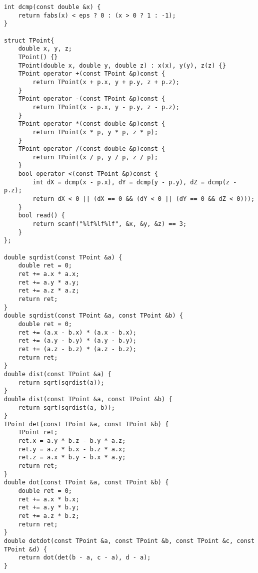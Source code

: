 \begin{lstlisting}
int dcmp(const double &x) {
	return fabs(x) < eps ? 0 : (x > 0 ? 1 : -1);
}

struct TPoint{
	double x, y, z;
	TPoint() {}
	TPoint(double x, double y, double z) : x(x), y(y), z(z) {}
	TPoint operator +(const TPoint &p)const {
		return TPoint(x + p.x, y + p.y, z + p.z);
	}
	TPoint operator -(const TPoint &p)const {
		return TPoint(x - p.x, y - p.y, z - p.z);
	}
	TPoint operator *(const double &p)const {
		return TPoint(x * p, y * p, z * p);
	}
	TPoint operator /(const double &p)const {
		return TPoint(x / p, y / p, z / p);
	}
	bool operator <(const TPoint &p)const {
		int dX = dcmp(x - p.x), dY = dcmp(y - p.y), dZ = dcmp(z - p.z);
		return dX < 0 || (dX == 0 && (dY < 0 || (dY == 0 && dZ < 0)));
	}
	bool read() {
		return scanf("%lf%lf%lf", &x, &y, &z) == 3;
	}
};

double sqrdist(const TPoint &a) {
	double ret = 0;
	ret += a.x * a.x;
	ret += a.y * a.y;
	ret += a.z * a.z;
	return ret;
}
double sqrdist(const TPoint &a, const TPoint &b) {
	double ret = 0;
	ret += (a.x - b.x) * (a.x - b.x);
	ret += (a.y - b.y) * (a.y - b.y);
	ret += (a.z - b.z) * (a.z - b.z);
	return ret;
}
double dist(const TPoint &a) {
	return sqrt(sqrdist(a));
}
double dist(const TPoint &a, const TPoint &b) {
	return sqrt(sqrdist(a, b));
}
TPoint det(const TPoint &a, const TPoint &b) {
	TPoint ret;
	ret.x = a.y * b.z - b.y * a.z;
	ret.y = a.z * b.x - b.z * a.x;
	ret.z = a.x * b.y - b.x * a.y;
	return ret;
}
double dot(const TPoint &a, const TPoint &b) {
	double ret = 0;
	ret += a.x * b.x;
	ret += a.y * b.y;
	ret += a.z * b.z;
	return ret;
}
double detdot(const TPoint &a, const TPoint &b, const TPoint &c, const TPoint &d) {
	return dot(det(b - a, c - a), d - a);
}
\end{lstlisting}
